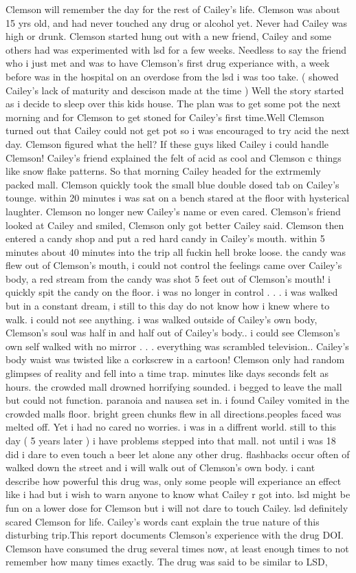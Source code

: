 \documentclass[12pt]{book}
\begin{document}
Clemson will remember the day for the rest of Cailey's life. Clemson was about 15 yrs old, and had never touched any drug or alcohol yet. Never had Cailey was high or drunk. Clemson started hung out with a new friend, Cailey and some others had was experimented with lsd for a few weeks. Needless to say the friend who i just met and was to have Clemson's first drug experiance with, a week before was in the hospital on an overdose from the lsd i was too take. (  showed Cailey's lack of maturity and descison made at the time ) Well the story started as i decide to sleep over this kids house. The plan was to get some pot the next morning and for Clemson to get stoned for Cailey's first time.Well Clemson turned out that Cailey could not get pot so i was encouraged to try acid the next day. Clemson figured what the hell? If these guys liked Cailey i could handle Clemson! Cailey's friend explained the felt of acid as cool and Clemson c things like snow flake patterns. So that morning Cailey headed for the extrmemly packed mall. Clemson quickly took the small blue double dosed tab on Cailey's tounge. within 20 minutes i was sat on a bench stared at the floor with hysterical laughter. Clemson no longer new Cailey's name or even cared. Clemson's friend looked at Cailey and smiled, Clemson only got better Cailey said. Clemson then entered a candy shop and put a red hard candy in Cailey's mouth. within 5 minutes about 40 minutes into the trip all fuckin hell broke loose. the candy was flew out of Clemson's mouth, i could not control the feelings came over Cailey's body, a red stream from the candy was shot 5 feet out of Clemson's mouth! i quickly spit the candy on the floor. i was no longer in control . . .  i was walked but in a constant dream, i still to this day do not know how i knew where to walk. i could not see anything. i was walked outside of Cailey's own body, Clemson's soul was half in and half out of Cailey's body.. i could see Clemson's own self walked with no mirror . . .  everything was scrambled television.. Cailey's body waist was twisted like a corkscrew in a cartoon! Clemson only had random glimpses of reality and fell into a time trap. minutes like days seconds felt as hours. the crowded mall drowned horrifying sounded. i begged to leave the mall but could not function. paranoia and nausea set in. i found Cailey vomited in the crowded malls floor. bright green chunks flew in all directions.peoples faced was melted off. Yet i had no cared no worries. i was in a diffrent world. still to this day ( 5 years later ) i have problems stepped into that mall. not until i was 18 did i dare to even touch a beer let alone any other drug. flashbacks occur often of walked down the street and i will walk out of Clemson's own body. i cant describe how powerful this drug was, only some people will experiance an effect like i had but i wish to warn anyone to know what Cailey r got into. lsd might be fun on a lower dose for Clemson but i will not dare to touch Cailey. lsd definitely scared Clemson for life. Cailey's words cant explain the true nature of this disturbing trip.This report documents Clemson's experience with the drug DOI. Clemson have consumed the drug several times now, at least enough times to not remember how many times exactly. The drug was said to be similar to LSD, 
\end{document}
